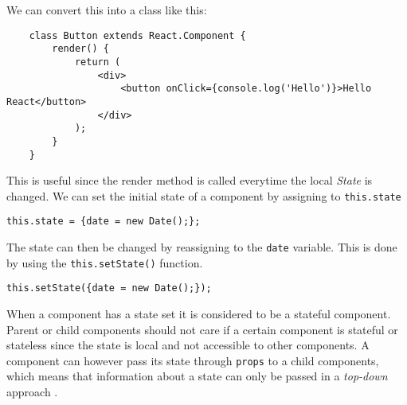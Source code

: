 We can convert this into a class like this:
\begin{lstlisting}
    class Button extends React.Component {
        render() {
            return (
                <div>
                    <button onClick={console.log('Hello')}>Hello React</button>
                </div>
            );
        }
    }
\end{lstlisting}
This is useful since the render method is called everytime the local \textit{State} is changed.
We can set the initial state of a component by assigning to \texttt{this.state}
\begin{center}
    \texttt{this.state = \{date = new Date();\};}
\end{center}
The state can then be changed by reassigning to the \texttt{date} variable. This is done by using the \texttt{this.setState()} function.
\begin{center}
    \texttt{this.setState(\{date = new Date();\});}
\end{center}
When a component has a state set it is considered to be a stateful component. 
Parent or child components should not care if a certain component is stateful or stateless since the state is local and not accessible to other components. 
A component can however pass its state through \texttt{props} to a child components, which means that information about a state can only be passed in a \textit{top-down} approach \cite{ReactJS}.
